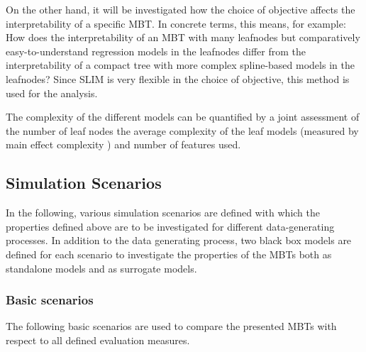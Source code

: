 \vspace{0.5cm}

On the other hand, it will be investigated how the choice of objective affects the interpretability of a specific MBT. In concrete terms, this means, for example: How does the interpretability of an MBT with many leafnodes but comparatively easy-to-understand regression models in the leafnodes differ from the interpretability of a compact tree with more complex spline-based models in the leafnodes?  Since SLIM is very flexible in the choice of objective, this method is used for the analysis.

\color{blue}
The complexity of the different models can be quantified by a joint assessment of the number of leaf nodes the average complexity of the leaf models (measured by main effect complexity \citep{Molnar.2020}) and number of features used.

\color{black}

\subsection{Simulation Scenarios}
In the following, various simulation scenarios are defined with which the properties defined above are to be investigated for different data-generating processes. In addition to the data generating process, two black box models are defined for each scenario to investigate the properties of the MBTs both as standalone models and as surrogate models.


\subsubsection{Basic scenarios}

The following basic scenarios are used to compare the presented MBTs with respect to all defined evaluation measures.




